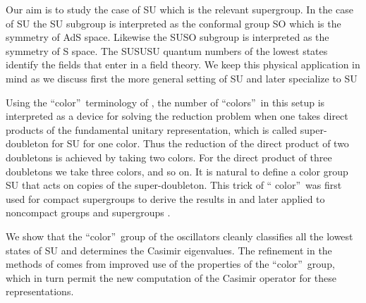 \documentclass[a4paper,aps,preprint,nofootinbib]{revtex4}
\begin{document}
Our aim is to study the case of SU\coordHE{} which is the
relevant supergroup. In the case of SU\coordHE{} the SU\coordHE{} subgroup is interpreted as the conformal group SO\coordHE{} which is the symmetry of AdS\coordHE{} space. Likewise the SU\myHighlight{$%
\left( 4\right) =$}\coordHE{}SO\myHighlight{$\left( 6\right) $}\coordHE{} subgroup is interpreted as the
symmetry of S\coordHE{} space. The SU\myHighlight{$\left( 2\right) \times$}\coordHE{}SU\myHighlight{$\left( 2\right)
\times$}\coordHE{}SU\myHighlight{$\left( 4\right) $}\coordHE{} quantum numbers of the lowest states identify
the fields that enter in a field theory. We keep this physical application
in mind as we discuss first the more general setting of SU\coordHE{} and later specialize to SU\coordHE{}

Using the \textquotedblleft color\textquotedblright\ terminology of \cite%
{barsgunaydin}, the number of \textquotedblleft colors\textquotedblright\ in
this setup is interpreted as a device for solving the reduction problem when
one takes direct products of the fundamental unitary representation, which
is called super-doubleton for SU\coordHE{} for one color. Thus the
reduction of the direct product of two doubletons is achieved by taking two
colors. For the direct product of three doubletons we take three colors, and
so on. It is natural to define a color group SU\coordHE{} that acts
on \coordHE{} copies of the super-doubleton. This trick of \textquotedblleft
color\textquotedblright\ was first used for compact supergroups to derive
the results in \cite{BB} and later applied to noncompact groups \cite{GS}
and supergroups \cite{barsgunaydin}.

We show that the \textquotedblleft color\textquotedblright\ group of the
oscillators cleanly classifies all the lowest states of SU\coordHE{} and
determines the Casimir eigenvalues. The refinement in the methods of \cite%
{barsgunaydin} comes from improved use of the properties of the
\textquotedblleft color\textquotedblright\ group, which in turn permit the
new computation of the Casimir operator for these representations.
\end{document}
